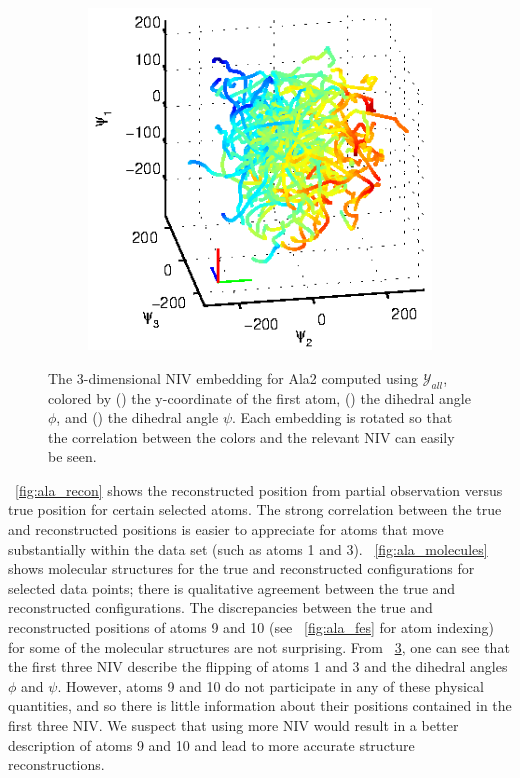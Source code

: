 \begin{figure}[t]
\begin{subfigure}{0.3\textwidth}
    \caption{}
    \label{subfig:ala_embed2}
\end{subfigure}
\begin{subfigure}{0.3\textwidth}
    \includegraphics[width=\textwidth]{ala2_embed3}
    \caption{}
    \label{subfig:ala_embed3}
\end{subfigure}
    \caption[Intrinsic variable embedding for alanine dipeptide data]{The 3-dimensional NIV embedding for Ala2 computed using $\mathcal{Y}_{all}$, colored by () the y-coordinate of the first atom, () the dihedral angle $\phi$, and () the dihedral angle $\psi$. Each embedding is rotated so that the correlation between the colors and the relevant NIV can easily be seen.}
    \label{fig:ala_embed}
\end{figure}


\fig~\ref{fig:ala_recon} shows the reconstructed position from partial observation versus true position for certain selected atoms.
%
The strong correlation between the true and reconstructed positions is easier to appreciate for
atoms that move substantially within the data set (such as atoms 1 and 3).
%
\fig~\ref{fig:ala_molecules} shows molecular structures for the true and reconstructed configurations for selected data points;
there is qualitative agreement between the true and reconstructed configurations.
%
The discrepancies between the true and reconstructed positions of atoms 9 and 10 (see \fig~\ref{fig:ala_fes} for atom indexing) for some of the molecular structures are not surprising.
%
From \fig~\ref{fig:ala_embed}, one can see that the first three NIV describe the flipping of atoms 1 and 3 and the dihedral angles $\phi$ and $\psi$.
%
However, atoms 9 and 10 do not participate in any of these physical quantities, and so there is little information about their positions contained in the first three NIV.
%
We suspect that using more NIV would result in a better description of atoms 9 and 10 and lead to more accurate structure reconstructions.

